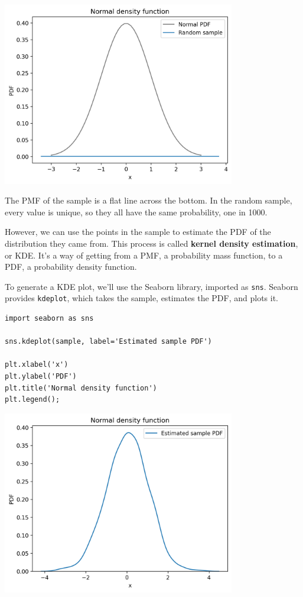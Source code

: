 \begin{center}
\includegraphics[width=4in]{chapters/08_distributions_files/08_distributions_120_0.png}
\end{center}

The PMF of the sample is a flat line across the bottom. In the random
sample, every value is unique, so they all have the same probability,
one in 1000.

However, we can use the points in the sample to estimate the PDF of the
distribution they came from. This process is called \textbf{kernel
density estimation}, or KDE. It's a way of getting from a PMF, a
probability mass function, to a PDF, a probability density function.

To generate a KDE plot, we'll use the Seaborn library, imported as
\passthrough{\lstinline!sns!}. Seaborn provides
\passthrough{\lstinline!kdeplot!}, which takes the sample, estimates the
PDF, and plots it.

\begin{lstlisting}[]
import seaborn as sns

sns.kdeplot(sample, label='Estimated sample PDF')

plt.xlabel('x')
plt.ylabel('PDF')
plt.title('Normal density function')
plt.legend();
\end{lstlisting}

\begin{center}
\includegraphics[width=4in]{chapters/08_distributions_files/08_distributions_122_0.png}
\end{center}

